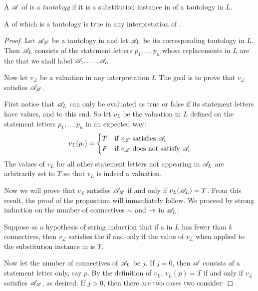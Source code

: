 \begin{definition}
  A \wf{} \(\mathscr{A}\) of \cl{} is a \textit{tautology} if it is a substitution instance in \cl{} of a tautology in \(L\).
\end{definition}

\begin{proposition}
  A \wf{} of \cl{} which is a tautology is true in any interpretation of \cl{}.

  \begin{proof}
    Let \(\mathscr{A}_{\mathscr{L}}\) be a tautology in \cl{} and let \(\mathscr{A}_{L}\) be its corresponding tautology in \(L\). Then \(\mathscr{A}_{L}\) consists of the statement letters \(p_1, \dots, p_n\) whose replacements in \(L\) are the \wfs{} that we shall label \(\mathscr{A}_1, \dots, \mathscr{A}_n\). 

    Now let \(v_{\mathscr{L}}\) be a valuation in any interpretation \(I\). The goal is to prove that \(v_{\mathscr{L}}\) satisfies \(\mathscr{A}_{\mathscr{L}}\). 

    First notice that \(\mathscr{A}_L\) can only be evaluated as true or false if its statement letters have values, and to this end. So let \(v_L\) be the valuation in \(L\) defined on the statement letters \(p_1, \dots, p_n\) in an expected way:
    \[
      v_L(p_i) =
        \begin{cases}
          T   &\text{if \(v_{\mathscr{L}}\) satisfies \(\ensuremath\mathscr{A}_i\)}\\
          F   &\text{if \(v_{\mathscr{L}}\) does not satisfy \(\ensuremath\mathscr{A}_i\)}
        \end{cases}
    \]
    The values of \(v_L\) for all other statement letters not appearing in \(\mathscr{A}_L\) are arbitrarily set to \(T\) so that \(v_L\) is indeed a valuation.

    Now we will prove that \(v_{\mathscr{L}}\) satisfies \(\mathscr{A}_{\mathscr{L}}\) if and only if \(v_L(\mathscr{A}_L) = T\). From this result, the proof of the proposition will immediately follow. We proceed by strong induction on the number of connectives \(\sim\) and \(\rightarrow\) in \(\mathscr{A}_L\):

    Suppose as a hypothesis of string induction that if a \wf{} in \(L\) has fewer than \(k\) connectives, then \(v_{\mathscr{L}}\) satisfies the \wf{} if and only if the value of \(v_L\) when applied to the substitution instance in \cl{} is \(T\).

    Now let the number of connectives of \(\mathscr{A}_L\) be \(j\). If \(j = 0\), then \(\mathscr{A}\) consists of a statement letter only, say \(p\). By the definition of \(v_L\), \(v_L(p) = T\) if and only if \(v_{\mathscr{L}}\) satisfies \(\mathscr{A}_{\mathscr{L}}\), as desired. If \(j > 0\), then there are two cases two consider:


\end{proof}
\end{proposition}

